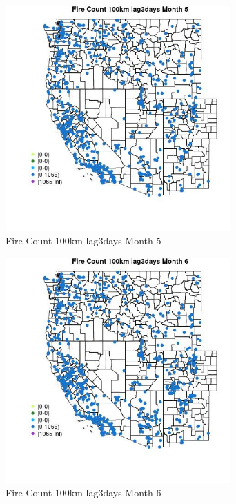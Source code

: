 \begin{figure} 
\centering  
\includegraphics[width=0.77\textwidth]{Code_Outputs/Report_ML_input_PM25_Step4_part_f_de_duplicated_aveswNAs_MapObsMo5Fire_Count_100km_lag3days.jpg} 
\caption{\label{fig:Report_ML_input_PM25_Step4_part_f_de_duplicated_aveswNAsMapObsMo5Fire_Count_100km_lag3days}Fire Count 100km lag3days Month 5} 
\end{figure} 
 

\begin{figure} 
\centering  
\includegraphics[width=0.77\textwidth]{Code_Outputs/Report_ML_input_PM25_Step4_part_f_de_duplicated_aveswNAs_MapObsMo6Fire_Count_100km_lag3days.jpg} 
\caption{\label{fig:Report_ML_input_PM25_Step4_part_f_de_duplicated_aveswNAsMapObsMo6Fire_Count_100km_lag3days}Fire Count 100km lag3days Month 6} 
\end{figure} 
 

